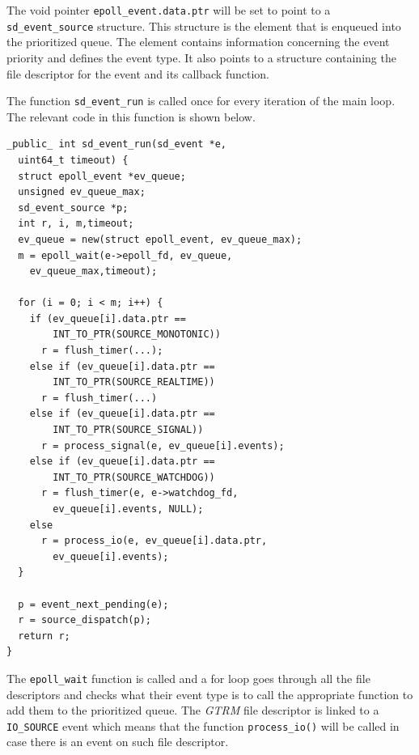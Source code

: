 \documentclass[nobiblatex]{LTHthesis}
\begin{document}
The void pointer \texttt{epoll\_event.data.ptr} will be set to point to a 
\texttt{sd\_event\_source} structure. This structure is the element that is
enqueued into the prioritized queue. The element contains information
concerning the event priority and defines the event type. It also points to
a structure containing the file descriptor for the event and its callback
function.

The function \texttt{sd\_event\_run} is called once for every iteration of
the main loop. The relevant code in this function is shown below.
\begin{lstlisting}
_public_ int sd_event_run(sd_event *e, 
  uint64_t timeout) {
  struct epoll_event *ev_queue;
  unsigned ev_queue_max;
  sd_event_source *p;
  int r, i, m,timeout;		
  ev_queue = new(struct epoll_event, ev_queue_max);
  m = epoll_wait(e->epoll_fd, ev_queue, 
	ev_queue_max,timeout);

  for (i = 0; i < m; i++) {
	if (ev_queue[i].data.ptr == 
		INT_TO_PTR(SOURCE_MONOTONIC))
	  r = flush_timer(...);
	else if (ev_queue[i].data.ptr == 
		INT_TO_PTR(SOURCE_REALTIME))
	  r = flush_timer(...)
	else if (ev_queue[i].data.ptr == 
		INT_TO_PTR(SOURCE_SIGNAL))
	  r = process_signal(e, ev_queue[i].events);
	else if (ev_queue[i].data.ptr == 
		INT_TO_PTR(SOURCE_WATCHDOG))
	  r = flush_timer(e, e->watchdog_fd, 
		ev_queue[i].events, NULL);
	else
	  r = process_io(e, ev_queue[i].data.ptr, 
		ev_queue[i].events);
  }

  p = event_next_pending(e);
  r = source_dispatch(p);
  return r;
}
\end{lstlisting}

The \texttt{epoll\_wait} function is called and a for loop goes through 
all the file descriptors and checks what their event type is to call the
appropriate function to add them to the prioritized queue.
The \emph{GTRM} file descriptor is linked to a \texttt{IO\_SOURCE} event which 
means that the function \texttt{process\_io()} will be called in case there
is an event on such file descriptor.
\end{document}
